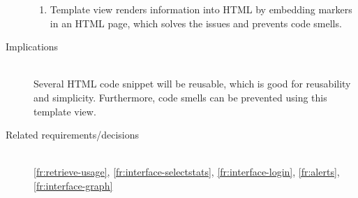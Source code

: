 \begin{description}
\begin{enumerate}
\item Template view renders information into HTML by embedding markers in an HTML page, which solves the issues and prevents code smells.
\end{enumerate}

\item [Implications]~\\
Several HTML code snippet will be reusable, which is good for reusability and simplicity. Furthermore, code smells can be prevented using this template view.

\item [Related requirements/decisions]~\\
\ref{fr:retrieve-usage}, \ref{fr:interface-selectstats}, \ref{fr:interface-login}, \ref{fr:alerts}, \ref{fr:interface-graph}

\end{description}
